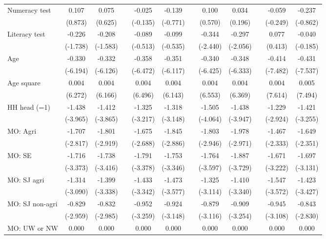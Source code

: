 {\begin{longtable}{@{\extracolsep{\fill}}lccccccccccc}
    Numeracy test & 0.107 & 0.075 &   & -0.025 & -0.139 &   & 0.100 & 0.034 &   & -0.059 & -0.237 \\
      & (0.873) & (0.625) &   & (-0.135) & (-0.771) &   & (0.570) & (0.196) &   & (-0.249) & (-0.862) \\
    Literacy test & -0.226 & -0.208 &   & -0.089 & -0.099 &   & -0.344 & -0.297 &   & 0.077 & -0.040 \\
      & (-1.738) & (-1.583) &   & (-0.513) & (-0.535) &   & (-2.440) & (-2.056) &   & (0.413) & (-0.185) \\
    Age & -0.330 & -0.332 &   & -0.358 & -0.351 &   & -0.340 & -0.348 &   & -0.414 & -0.431 \\
      & (-6.194) & (-6.126) &   & (-6.472) & (-6.117) &   & (-6.425) & (-6.333) &   & (-7.482) & (-7.537) \\
    Age square & 0.004 & 0.004 &   & 0.004 & 0.004 &   & 0.004 & 0.004 &   & 0.004 & 0.005 \\
      & (6.272) & (6.166) &   & (6.496) & (6.143) &   & (6.553) & (6.369) &   & (7.614) & (7.494) \\
    HH head (=1) & -1.438 & -1.412 &   & -1.325 & -1.318 &   & -1.505 & -1.438 &   & -1.229 & -1.421 \\
      & (-3.965) & (-3.865) &   & (-3.217) & (-3.148) &   & (-4.064) & (-3.947) &   & (-2.924) & (-3.255) \\
    MO: Agri & -1.707 & -1.801 &   & -1.675 & -1.845 &   & -1.803 & -1.978 &   & -1.467 & -1.649 \\
      & (-2.817) & (-2.919) &   & (-2.688) & (-2.886) &   & (-2.946) & (-2.971) &   & (-2.333) & (-2.351) \\
    MO: SE & -1.716 & -1.738 &   & -1.791 & -1.753 &   & -1.764 & -1.887 &   & -1.671 & -1.697 \\
      & (-3.373) & (-3.416) &   & (-3.378) & (-3.346) &   & (-3.597) & (-3.729) &   & (-3.222) & (-3.131) \\
    MO: SJ agri & -1.314 & -1.399 &   & -1.433 & -1.473 &   & -1.325 & -1.410 &   & -1.547 & -1.423 \\
      & (-3.090) & (-3.338) &   & (-3.342) & (-3.577) &   & (-3.114) & (-3.340) &   & (-3.572) & (-3.427) \\
    MO: SJ non-agri & -0.829 & -0.832 &   & -0.952 & -0.924 &   & -0.879 & -0.909 &   & -0.945 & -0.843 \\
      & (-2.959) & (-2.985) &   & (-3.259) & (-3.148) &   & (-3.116) & (-3.254) &   & (-3.108) & (-2.830) \\
    MO: UW or NW & 0.000 & 0.000 &   & 0.000 & 0.000 &   & 0.000 & 0.000 &   & 0.000 & 0.000 \\

\end{longtable}}

